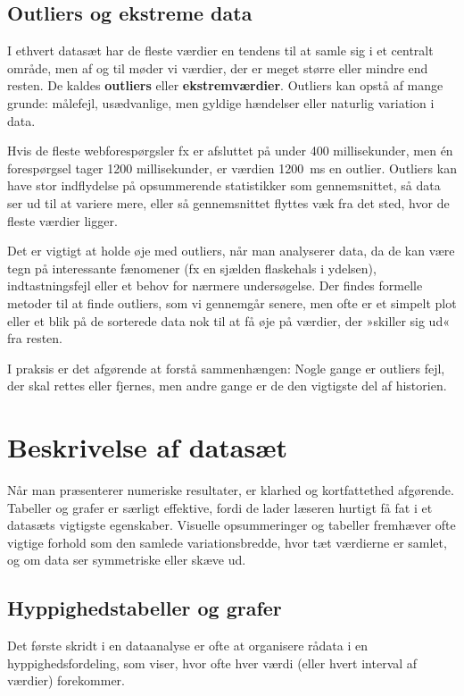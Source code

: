 \subsection*{Outliers og ekstreme data}

I ethvert datasæt har de fleste værdier en tendens til at samle sig i et centralt område, men af og til møder vi værdier, der er meget større eller mindre end resten. De kaldes \textbf{outliers} eller \textbf{ekstremværdier}. Outliers kan opstå af mange grunde: målefejl, usædvanlige, men gyldige hændelser eller naturlig variation i data.

Hvis de fleste webforespørgsler fx er afsluttet på under 400 millisekunder, men én forespørgsel tager 1200 millisekunder, er værdien 1200~ms en outlier. Outliers kan have stor indflydelse på opsummerende statistikker som gennemsnittet, så data ser ud til at variere mere, eller så gennemsnittet flyttes væk fra det sted, hvor de fleste værdier ligger.

Det er vigtigt at holde øje med outliers, når man analyserer data, da de kan være tegn på interessante fænomener (fx en sjælden flaskehals i ydelsen), indtastningsfejl eller et behov for nærmere undersøgelse. Der findes formelle metoder til at finde outliers, som vi gennemgår senere, men ofte er et simpelt plot eller et blik på de sorterede data nok til at få øje på værdier, der »skiller sig ud« fra resten.

I praksis er det afgørende at forstå sammenhængen: Nogle gange er outliers fejl, der skal rettes eller fjernes, men andre gange er de den vigtigste del af historien.

\section{Beskrivelse af datasæt}
Når man præsenterer numeriske resultater, er klarhed og kortfattethed afgørende. Tabeller og grafer er særligt effektive, fordi de lader læseren hurtigt få fat i et datasæts vigtigste egenskaber. Visuelle opsummeringer og tabeller fremhæver ofte vigtige forhold som den samlede variationsbredde, hvor tæt værdierne er samlet, og om data ser symmetriske eller skæve ud.

\subsection*{Hyppighedstabeller og grafer} \label{sub:frequency_tables_and_graphs}

Det første skridt i en dataanalyse er ofte at organisere rådata i en hyppighedsfordeling, som viser, hvor ofte hver værdi (eller hvert interval af værdier) forekommer.

